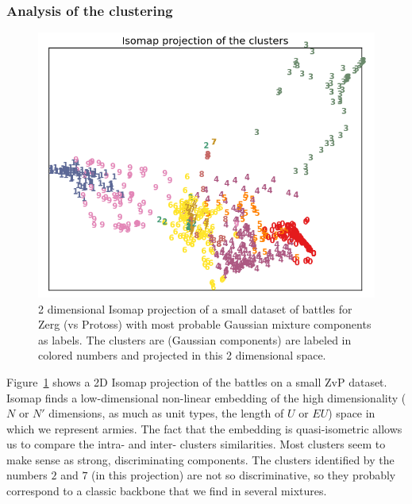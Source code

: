 \subsubsection{Analysis of the clustering}
\begin{figure}
\centerline{\includegraphics[width=0.65\columnwidth]{images/GMM_ISO_Z2.png}}
\caption{2 dimensional Isomap projection of a small dataset of battles for Zerg (vs Protoss) with most probable Gaussian mixture components as labels. The clusters are (Gaussian components) are labeled in colored numbers and projected in this 2 dimensional space.}
\label{fig:isoz}
\end{figure}

Figure~\ref{fig:isoz} shows a 2D Isomap \citep{isomap} projection of the battles on a small ZvP dataset. Isomap finds a low-dimensional non-linear embedding of the high dimensionality ($N$ or $N'$ dimensions, as much as unit types, the length of $U$ or $EU$) space in which we represent armies. The fact that the embedding is quasi-isometric allows us to compare the intra- and inter- clusters similarities. Most clusters seem to make sense as strong, discriminating components. The clusters identified by the numbers $2$ and $7$ (in this projection) are not so discriminative, so they probably correspond to a classic backbone that we find in several mixtures.


